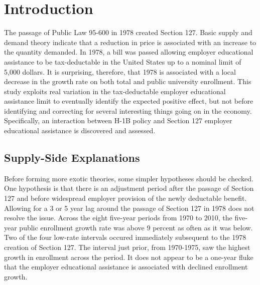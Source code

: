 \documentclass[review]{elsarticle}
\begin{document}
\pagebreak
\linenumbers

    \section{Introduction}



    The passage of Public Law 95-600 in 1978 created Section 127\cite{plaw95_600_1978}.
    Basic supply and demand theory indicate that a reduction in price is associated with an increase to the quantity demanded.
    In 1978, a bill was passed allowing employer educational assistance to be tax-deductable in the United States up to a nominal limit of 5,000 dollars.
    It is surprising, therefore, that 1978 is associated with a local decrease in the growth rate on both total and public university enrollment.
    This study exploits real variation in the tax-deductable employer educational assistance limit to eventually identify the expected positive effect,
    but not before identifying and correcting for several interesting things going on in the economy.
    Specifically, an interaction between H-1B policy and Section 127 employer educational assistance is discovered and assessed.

    \subsection{Supply-Side Explanations}
    Before forming more exotic theories, some simpler hypotheses should be checked.
    One hypothesis is that there is an adjustment period after the passage of Section 127 and before widespread employer provision of the newly deductable benefit.
    Allowing for a 3 or 5 year lag around the passage of Section 127 in 1978 does not resolve the issue.
    Across the eight five-year periods from 1970 to 2010, the five-year public enrollment growth rate was above 9 percent as often as it was below.
    Two of the four low-rate intervals occured immediately subsequent to the 1978 creation of Section 127.
    The interval just prior, from 1970-1975, saw the highest growth in enrollment across the period.
    It does not appear to be a one-year fluke that the employer educational assistance is associated with declined enrollment growth.
    
\end{document}
